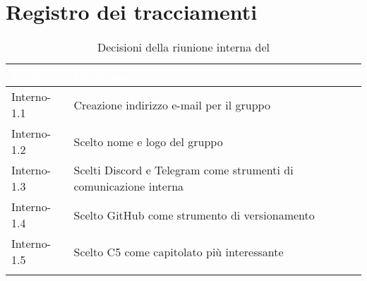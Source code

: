 \section{Registro dei tracciamenti}
{

\renewcommand{\arraystretch}{1.5}
\centering
\begin{longtable}{C{3cm} C{9cm}}
\textcolor{white}{\textbf{Codice}}&
\textcolor{white}{\textbf{Decisione}}\\	
\endhead
		
Interno-1.1 & Creazione indirizzo e-mail per il gruppo\\

Interno-1.2 & Scelto nome e logo del gruppo\\

Interno-1.3 & Scelti Discord e Telegram come strumenti di comunicazione interna\\

Interno-1.4 & Scelto GitHub come strumento di versionamento\\

Interno-1.5 & Scelto C5 come capitolato più interessante\\
		
\caption{Decisioni della riunione interna del \Data{}}		
\end{longtable}
}
